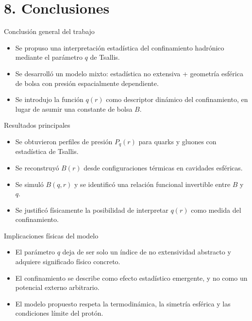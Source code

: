 \documentclass{beamer}
\begin{document}
\section[Conclusiones]{8. Conclusiones}
\begin{frame}{Conclusión general del trabajo}
  \begin{itemize}
    \item Se propuso una interpretación estadística del confinamiento hadrónico mediante el parámetro \( q \) de Tsallis.
    \item Se desarrolló un modelo mixto: estadística no extensiva + geometría esférica de bolsa con presión espacialmente dependiente.
    \item Se introdujo la función \( q(r) \) como descriptor dinámico del confinamiento, en lugar de asumir una constante de bolsa \( B \).
  \end{itemize}
\end{frame}

\begin{frame}{Resultados principales}
  \begin{itemize}
    \item Se obtuvieron perfiles de presión \( P_q(r) \) para quarks y gluones con estadística de Tsallis.
    \item Se reconstruyó \( B(r) \) desde configuraciones térmicas en cavidades esféricas.
    \item Se simuló \( B(q, r) \) y se identificó una relación funcional invertible entre \( B \) y \( q \).
    \item Se justificó físicamente la posibilidad de interpretar \( q(r) \) como medida del confinamiento.
  \end{itemize}
\end{frame}

\begin{frame}{Implicaciones físicas del modelo}
  \begin{itemize}
    \item El parámetro \( q \) deja de ser solo un índice de no extensividad abstracto y adquiere significado físico concreto.
    \item El confinamiento se describe como efecto estadístico emergente, y no como un potencial externo arbitrario.
    \item El modelo propuesto respeta la termodinámica, la simetría esférica y las condiciones límite del protón.
  \end{itemize}
\end{frame}
\end{document}
